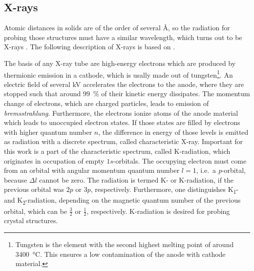 \subsection{X-rays}
Atomic distances in solids are of the order of several \si{\angstrom}, so the radiation for probing those structures must have a similar wavelength, which turns out to be X-rays
    \cite{harrington2021}.
The following description of X-rays is based on \textcite{spiess2009}.

The basis of any X-ray tube are high-energy electrons which are produced by thermionic emission in a cathode, which is usally made out of tungsten\footnote{
    Tungsten is the element with the second highest melting point of around \qty{3400}{\celsius}.
    This ensures a low contamination of the anode with cathode material.
}.
An electric field of several \si{\kV} accelerates the electrons to the anode, where they are stopped such that around \qty{99}{\percent} of their kinetic energy dissipates.
The momentum change of electrons, which are charged particles, leads to emission of \textit{bremsstrahlung}.
Furthermore, the electrons ionize atoms of the anode material which leads to unoccupied electron states.
If those states are filled by electrons with higher quantum number $n$, the difference in energy of those levels is emitted as radiation with a discrete spectrum, called characteristic X-ray.
Important for this work is a part of the characteristic spectrum, called K-radiation, which originates in occupation of empty $1s$-orbitals.
The occupying electron must come from an orbital with angular momentum quantum number $l=1$, i.e.\ a \textit{p}-orbital, because $\Delta l$ cannot be zero.
The radiation is termed K\textalpha- or K\textbeta-radiation, if the previous orbital was $2p$ or $3p$, respectively.
Furthermore, one distinguishes K\textalpha\textsubscript{1}- and K\textalpha\textsubscript{2}-radiation, depending on the magnetic quantum number of the previous orbital, which can be $\frac{3}{2}$ or $\frac{1}{2}$, respectively.
K\textalpha-radiation is desired for probing crystal structures.